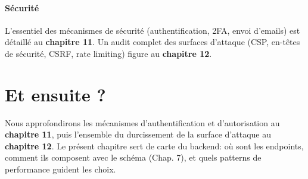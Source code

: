 \paragraph{Sécurité} L'essentiel des mécanismes de sécurité (authentification, 2FA, envoi d'emails) est détaillé au \textbf{chapitre 11}. Un audit complet des surfaces d'attaque (CSP, en-têtes de sécurité, CSRF, rate limiting) figure au \textbf{chapitre 12}.

\section*{Et ensuite ?}
Nous approfondirons les mécanismes d'authentification et d'autorisation au \textbf{chapitre 11}, puis l'ensemble du durcissement de la surface d'attaque au \textbf{chapitre 12}. Le présent chapitre sert de carte du backend: où sont les endpoints, comment ils composent avec le schéma (Chap. 7), et quels patterns de performance guident les choix.
